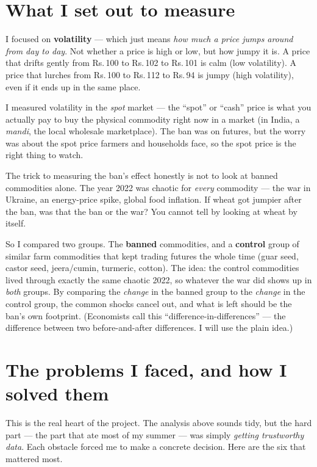 \documentclass[11pt]{article}
\newcommand{\rupee}{\textrm{Rs.}\,}
\begin{document}
\section*{What I set out to measure}

I focused on \textbf{volatility} --- which just means \emph{how much a price jumps around from day to day}. Not whether a price is high or low, but how jumpy it is. A price that drifts gently from \rupee 100 to \rupee 102 to \rupee 101 is calm (low volatility). A price that lurches from \rupee 100 to \rupee 112 to \rupee 94 is jumpy (high volatility), even if it ends up in the same place.

I measured volatility in the \emph{spot} market --- the ``spot'' or ``cash'' price is what you actually pay to buy the physical commodity right now in a market (in India, a \emph{mandi}, the local wholesale marketplace). The ban was on futures, but the worry was about the spot price farmers and households face, so the spot price is the right thing to watch.

The trick to measuring the ban's effect honestly is not to look at banned commodities alone. The year 2022 was chaotic for \emph{every} commodity --- the war in Ukraine, an energy-price spike, global food inflation. If wheat got jumpier after the ban, was that the ban or the war? You cannot tell by looking at wheat by itself.

So I compared two groups. The \textbf{banned} commodities, and a \textbf{control} group of similar farm commodities that kept trading futures the whole time (guar seed, castor seed, jeera/cumin, turmeric, cotton). The idea: the control commodities lived through exactly the same chaotic 2022, so whatever the war did shows up in \emph{both} groups. By comparing the \emph{change} in the banned group to the \emph{change} in the control group, the common shocks cancel out, and what is left should be the ban's own footprint. (Economists call this ``difference-in-differences'' --- the difference between two before-and-after differences. I will use the plain idea.)

\section*{The problems I faced, and how I solved them}

This is the real heart of the project. The analysis above sounds tidy, but the hard part --- the part that ate most of my summer --- was simply \emph{getting trustworthy data}. Each obstacle forced me to make a concrete decision. Here are the six that mattered most.
\end{document}
